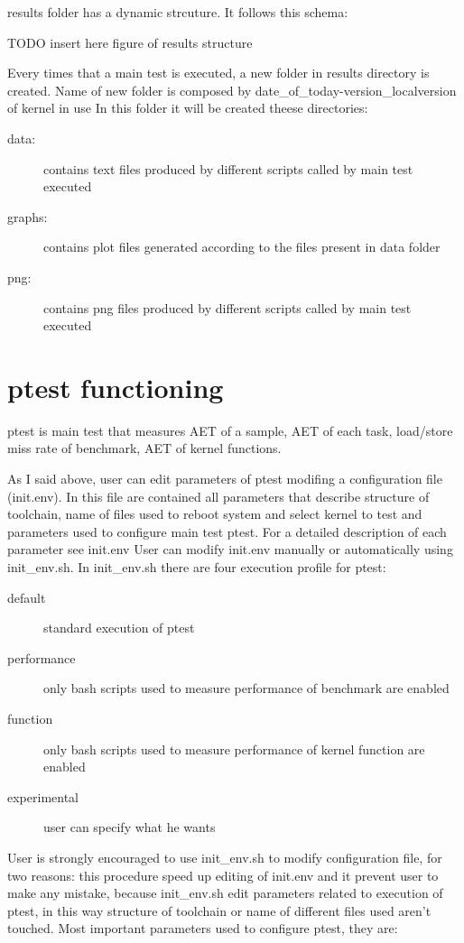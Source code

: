 \documentclass[a4paper,10pt]{article}
\begin{document}
\begin{multicols}{2}
results folder has a dynamic strcuture. It follows this schema:

TODO insert here figure of results structure

Every times that a main test is executed, a new folder in results directory is created.
Name of new folder is composed by date\_of\_today-version\_localversion of kernel in use
In this folder it will be created theese directories:

\begin{description}
	\item[data:] contains text files produced by different scripts called by main test executed
	\item[graphs:] contains plot files generated according to the files present in data folder
	\item[png:] contains png files produced by different scripts called by main test executed
\end{description}


\section{ptest functioning}

ptest is main test that measures AET of a sample, AET of each task, load/store 
miss rate of benchmark, AET of kernel functions.

As I said above, user can edit parameters of ptest modifing a configuration file (init.env).
In this file are contained all parameters that describe structure of toolchain, name of files
used to reboot system and select kernel to test and parameters used to configure main test
ptest. For a detailed description of each parameter see init.env
User can modify init.env manually or automatically using init_env.sh.
In init_env.sh there are four execution profile for ptest:
\begin{description}
	\item[default] standard execution of ptest
	\item[performance] only bash scripts used to measure performance of benchmark are enabled 
	\item[function] only bash scripts used to measure performance of kernel function are enabled
	\item[experimental] user can specify what he wants
\end{description}

User is strongly encouraged to use init_env.sh to modify configuration file, for two reasons:
this procedure speed up editing of init.env and it prevent user to make any mistake, because init_env.sh
edit parameters related to execution of ptest, in this way structure of toolchain or name of different
files used aren't touched. 
Most important parameters used to configure ptest, they are:


\end{multicols}
\end{document}
